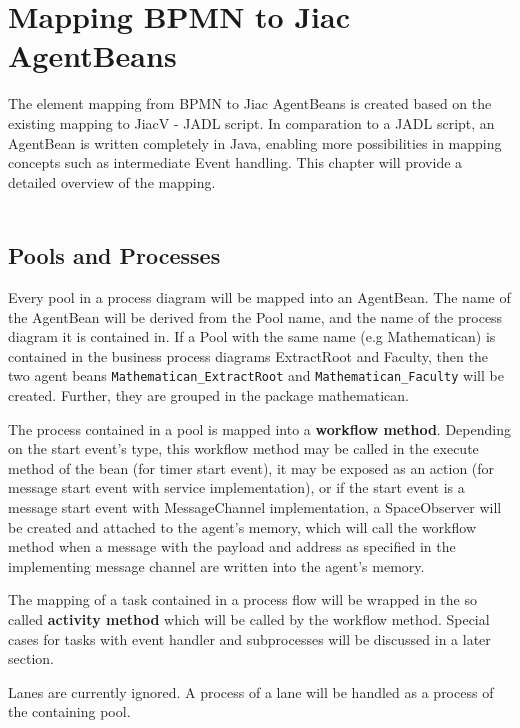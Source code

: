 \chapter{Mapping BPMN to Jiac AgentBeans}
\label{chap:mapping}
The element mapping from BPMN to Jiac AgentBeans is created based on the existing mapping to JiacV - JADL script. In comparation to a JADL script, an AgentBean is written completely in Java, enabling more possibilities in mapping concepts such as intermediate Event handling. This chapter will provide a detailed overview of the mapping.\\\\

\section{Pools and Processes}
Every pool in a process diagram will be mapped into an AgentBean. The name of the AgentBean will be derived from the Pool name, and the name of the process diagram it is contained in. If a Pool with the same name (e.g Mathematican) is contained in the business process diagrams ExtractRoot and Faculty, then the two agent beans \texttt{Mathematican\_ExtractRoot} and \texttt{Mathematican\_Faculty} will be created. Further, they are grouped in the package mathematican. 

The process contained in a pool is mapped into a \textbf{workflow method}. Depending on the start event's type, this workflow method may be called in the execute method of the bean (for timer start event), it may be exposed as an action (for message start event with service implementation), or if the start event is a message start event with MessageChannel implementation, a SpaceObserver will be created and attached to the agent's memory, which will call the workflow method when a message with the payload and address as specified in the implementing message channel are written into the agent's memory.

The mapping of a task contained in a process flow will be wrapped in the so called \textbf{activity method} which will be called by the workflow method. Special cases for tasks with event handler and subprocesses will be discussed in a later section.

Lanes are currently ignored. A process of a lane will be handled as a process of the containing pool.

